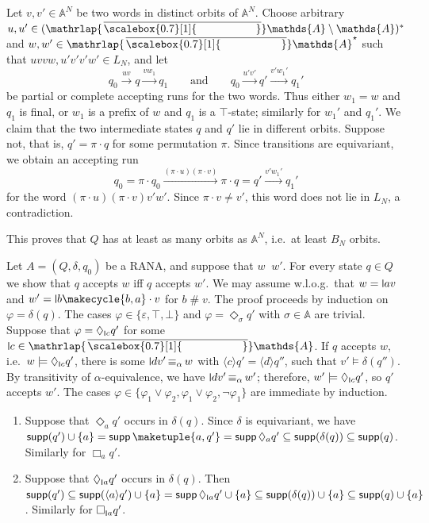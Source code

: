 \documentclass[10pt,a4paper]{amsart}
\theoremstyle{definition}
\newcommand{\seq}{\subseteq}
\newcommand{\xra}[1]{\xrightarrow{#1}}
\newcommand{\xto}[1]{\xra{#1}}
\newcommand{\At}{\mathds{A}}
\newcommand{\barAs}{\barNames^{\star}}
\DeclareMathOperator{\supp}{\mathsf{supp}}
\newcommand{\names}{\At}
\newcommand{\namesN}{\At^{\!N}}
\newcommand{\braket}[1]{\langle #1 \rangle}
\newcommand{\fresh}{\mathbin{\#}}
\renewcommand{\phi}{\varphi}
\newcommand{\set}[1]{\{#1\}}
\DeclareMathOperator{\alphaequiv}{\equiv_{\alpha}}
\newcommand{\mybar}[3]{%
  \mathrlap{\hspace{#2}\overline{\scalebox{#1}[1]{\phantom{\ensuremath{#3}}}}}\ensuremath{#3}
}
\newcommand{\barNames}{{\mybar{0.7}{1.25pt}{\names}}}
\renewcommand{\vDash}{\models}
\newcommand{\midmid}{\hspace{0.2ex}{\rule[-0.1ex]{0.6pt}{1.65ex}}\hspace{0.2ex}}
\newcommand{\scriptmidmid}{\hspace{0.2ex}{\rule[-0.1ex]{0.6pt}{1.1ex}}\hspace{0.2ex}}
\newcommand{\newletter}[1]{{\midmid}#1}
\newcommand{\scriptnew}[1]{{\scriptmidmid}#1}
\begin{document}
 Let $v,v'\in \namesN$ be two words in distinct orbits of $\namesN$. Choose arbitrary $u,u' \in (\barNames\setminus\names)^*$ and $w,w'\in \barAs$ such that $uvvw,u'v'v'w'\in L_N$, and let
\[ q_0\xto{uv} q\xto {vw_1} q_1 \qquad\text{and}\qquad q_0 \xto{u'v'} q' \xto{v'w_1'} q_1' \]
be partial or complete accepting runs for the two words. Thus either $w_1=w$ and $q_1$ is
final, or $w_1$ is a prefix of $w$ and $q_1$ is a $\top$-state; similarly for $w_1'$ and
$q_1'$. We claim that the two intermediate states $q$ and $q'$ lie in different orbits. Suppose not, that is, $q'=\pi\cdot q$ for some permutation $\pi$. Since transitions are equivariant, we obtain an accepting run
\[ q_0 = \pi\cdot q_0 \xto{(\pi\cdot u)(\pi\cdot v)} \pi\cdot q = q' \xto{v'w_1'} q_1' \]
for the word $(\pi\cdot u)(\pi\cdot v) v'w'$. Since $\pi\cdot v\neq v'$, this word does not lie in $L_N$, a contradiction. 

This proves that $Q$ has at least as many orbits as $\namesN$, i.e.~at least $B_N$ orbits. 





\begin{IEEEproof}
Let $A=(Q,\delta,q_0)$ be a RANA, and suppose that $w \alphaequiv w'$.
  For every state $q\in Q$ we show that $q$ accepts $w$ iff $q$ accepts $w'$. We may assume w.l.o.g.~that $w = \newletter{a}v$ and $w' = \newletter{b}\makecycle{b,a}\cdot v$ for $b \fresh v$. The proof proceeds by induction on $\varphi = \delta(q)$. The cases $\varphi \in \set{\varepsilon,\top,
    \bot}$ and $\varphi = \Diamond_\sigma q'$ with $\sigma \in \names$ are trivial.
  Suppose that $\varphi = \Diamond_{\scriptnew{c}} q'$ for some $\newletter{c} \in \barNames$.
  If $q$ accepts $w$, i.e.~$w\vDash\Diamond_{\scriptnew{c}}q'$, there is some $\newletter{d}v' \alphaequiv w$ with $\braket{c}q'  = \braket{d}q''$, such that $v' \vDash \delta(q'')$.
 By transitivity of $\alpha$-equivalence, we have $\newletter{d}v' \alphaequiv w'$; therefore, $w'\vDash\Diamond_{\scriptnew{c}}q'$, so $q'$ accepts $w'$.
  The cases $\varphi\in \{\varphi_1\vee \varphi_2, \varphi_1\vee \varphi_2, \neg \phi_1\}$ are immediate by induction.
\end{IEEEproof}

\begin{IEEEproof}
    \begin{enumerate}
        \item Suppose that $\Diamond_a q'$ occurs in $\delta(q)$. Since $\delta$ is equivariant, we have $\supp(q') \cup \set{a} = \supp\maketuple{a,q'} = \supp \Diamond_a q' \seq \supp(\delta(q)) \seq \supp(q)$. Similarly for $\Box_a q'$.
        \item Suppose that $\Diamond_{\scriptnew a} q'$ occurs in $\delta(q)$. Then  $\supp(q') \seq \supp(\braket{a}q') \cup \set{a} = \supp \Diamond_{\scriptnew a} q' \cup \{a\} \seq \supp(\delta(q)) \cup \set{a}
            \seq \supp(q) \cup \set{a}$. Similarly for $\Box_{\scriptnew a} q'$. \hfill\IEEEQEDhere
    \end{enumerate}
\end{IEEEproof}
\end{document}
